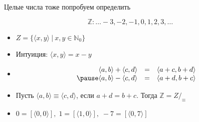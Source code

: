 \documentclass[handout]{beamer}
\begin{document}
\begin{frame}{Целые числа тоже попробуем определить}

 $$\mathbb{Z}: \dots -3, -2, -1, 0, 1, 2, 3, \dots$$\pause\vspace{-0.5cm}
\begin{itemize}
\item     $Z = \{\langle x, y \rangle\ |\ x,y\in \mathbb{N}_0\}$ \pause
\item Интуиция: $\langle x,y\rangle = x-y$\pause
\item $$\begin{array}{rcl}
      \langle a, b \rangle + \langle c, d \rangle & = & \langle a + c, b + d \rangle \\ \pause
      \langle a, b \rangle - \langle c, d \rangle & = & \langle a + d, b + c \rangle 
  \end{array}$$\pause
\item     Пусть $\langle a, b \rangle \equiv \langle c,d\rangle$, если $a + d = b + c$. Тогда $\mathbb{Z} = Z/_\equiv$\pause
\item      $0 = [\langle 0,0 \rangle],\; 1 = [\langle 1,0\rangle],\; -7 = [\langle 0,7 \rangle]$

\end{itemize}
\end{frame}
\end{document}
